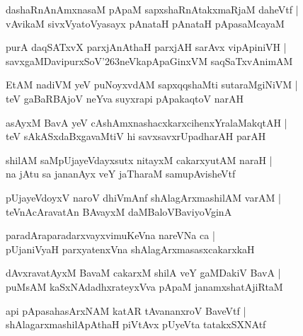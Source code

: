 \documentclass[twoside,12pt,openright]{book}
\def\S{\char'263}
\newcounter{shloka}[chapter]
\begin{document}
\begin{shloka}%
dashaRnAnAmxnasaM pApaM sapxshaRnAtakxmaRjaM daheVtf |\\
vAvikaM sivxVyatoVyasayx pAnataH pAnataH pApasaMcayaM
\end{shloka}

\begin{shloka}%
purA daqSATxvX parxjAnAthaH parxjAH sarAvx vipApiniVH |\\
savxgaMDavipurxSoV\S neVkapApaGinxVM saqSaTxvAnimAM 
\end{shloka}

\begin{shloka}%
EtAM nadiVM yeV puNoyxvdAM sapxqqshaMti sutaraMgiNiVM |\\
teV gaBaRBAjoV neYva suyxrapi pApakaqtoV narAH
\end{shloka}

\begin{shloka}%
asAyxM BavA yeV cAshAmxnashacxkarxcihenxYralaMakqtAH |\\
teV sAkASxdaBxgavaMtiV hi savxsavxrUpadharAH parAH 
\end{shloka}

\begin{shloka}%
shilAM saMpUjayeVdayxsutx nitayxM cakarxyutAM naraH |\\
na jAtu sa jananAyx veY jaTharaM samupAvisheVtf
\end{shloka}

\begin{shloka}%
pUjayeVdoyxV naroV dhiVmAnf shAlagArxmashilAM varAM |\\
teVnAcAravatAn BAvayxM daMBaloVBaviyoVginA
\end{shloka}

\begin{shloka}%
paradAraparadarxvayxvimuKeVna nareVNa ca |\\
pUjaniVyaH parxyatenxVna shAlagArxmasasxcakarxkaH 
\end{shloka}

\begin{shloka}%
dAvxravatAyxM BavaM cakarxM shilA veY gaMDakiV BavA |\\
puMsAM kaSxNAdadhxrateyxVva pApaM janamxshatAjiRtaM 
\end{shloka}

\begin{shloka}%
api pApasahasArxNAM katAR tAvananxroV BaveVtf |\\
shAlagarxmashilApAthaH piVtAvx pUyeVta tatakxSXNAtf
\end{shloka}
\end{document}
